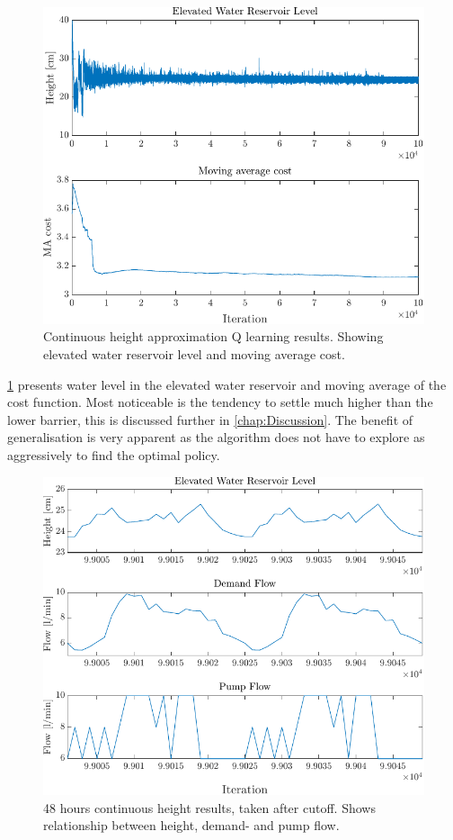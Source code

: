 \begin{figure}[h!]
	\centering
	\includegraphics[width=0.7\linewidth]{figures/ContiniousHResults2.pdf}
	\caption{Continuous height approximation Q learning results. Showing elevated water reservoir level and moving average cost.}
	\label{fig:ContiniousHResults1}
\end{figure}

\cref{fig:ContiniousHResults1} presents water level in the elevated water reservoir and moving average of the cost function. Most noticeable is the tendency to settle much higher than the lower barrier, this is discussed further in \cref{chap:Discussion}. The benefit of generalisation is very apparent as the algorithm does not have to explore as aggressively to find the optimal policy.

\begin{figure}[h!]
	\centering
	\includegraphics[width=0.7\linewidth]{figures/ContiniousHResults1.pdf}
	\caption{48 hours continuous height results, taken after cutoff. Shows relationship between height, demand- and pump flow.}
	\label{fig:ContiniousHResults2}
\end{figure} 

